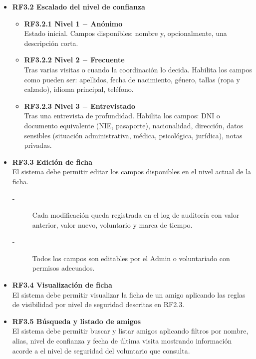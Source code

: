 \begin{itemize}
    \item \textbf{RF3.2 Escalado del nivel de confianza}
    \begin{itemize}
        \item \textbf{RF3.2.1 Nivel 1 $-$ Anónimo} \\
        Estado inicial. Campos disponibles: nombre y, opcionalmente, una descripción corta.
        \item \textbf{RF3.2.2 Nivel 2 $-$ Frecuente} \\
        Tras varias visitas o cuando la coordinación lo decida. Habilita los
        campos como pueden ser: apellidos, fecha de nacimiento, género, tallas (ropa y
        calzado), idioma principal, teléfono.
        \item \textbf{RF3.2.3 Nivel 3 $-$ Entrevistado} \\
        Tras una entrevista de profundidad. Habilita los campos: DNI o
        documento equivalente (NIE, pasaporte), nacionalidad, dirección, datos
        sensibles (situación administrativa, médica, psicológica, jurídica),
        notas privadas.
    \end{itemize}
    
    \item \textbf{RF3.3 Edición de ficha} \\
    El sistema debe permitir editar los campos disponibles en el nivel actual de la ficha.
    \begin{description}
        \item[-] Cada modificación queda registrada en el log de auditoría con valor 
        anterior, valor nuevo, voluntario y marca de tiempo.
        \item[-] Todos los campos son editables por el Admin o voluntariado con permisos adecuados.
    \end{description}
    
    \item \textbf{RF3.4 Visualización de ficha} \\
    El sistema debe permitir visualizar la ficha de un amigo aplicando las
    reglas de visibilidad por nivel de seguridad descritas en RF2.3.
    
    \item \textbf{RF3.5 Búsqueda y listado de amigos} \\
    El sistema debe permitir buscar y listar amigos aplicando filtros por
    nombre, alias, nivel de confianza y fecha de última visita mostrando información acorde a
    el nivel de seguridad del voluntario que consulta.
    

\end{itemize}
